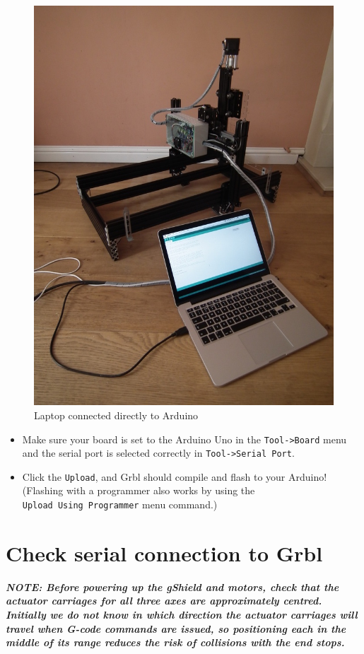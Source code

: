 \documentclass[]{book}
\providecommand{\tightlist}{%
  \setlength{\itemsep}{0pt}\setlength{\parskip}{0pt}}
\theoremstyle{definition}
\theoremstyle{definition}
\theoremstyle{remark}
\begin{document}
\begin{figure}

{\centering \includegraphics[width=0.75\linewidth]{images/laptop_connected_to_arduino} 

}

\caption{Laptop connected directly to Arduino}\label{fig:laptop2arduino}
\end{figure}

\begin{itemize}
\tightlist
\item
  Make sure your board is set to the Arduino Uno in the
  \texttt{Tool-\textgreater{}Board} menu and the serial port is selected
  correctly in \texttt{Tool-\textgreater{}Serial\ Port}.
\item
  Click the \texttt{Upload}, and Grbl should compile and flash to your
  Arduino! (Flashing with a programmer also works by using the
  \texttt{Upload\ Using\ Programmer} menu command.)
\end{itemize}

\section{Check serial connection to
Grbl}\label{check-serial-connection-to-grbl}

\emph{\textbf{NOTE: Before powering up the gShield and motors, check
that the actuator carriages for all three axes are approximately
centred. Initially we do not know in which direction the actuator
carriages will travel when G-code commands are issued, so positioning
each in the middle of its range reduces the risk of collisions with the
end stops.}}
\end{document}

